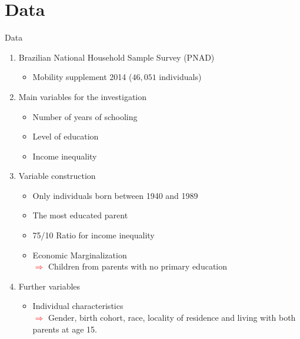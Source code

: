 \documentclass{beamer}
\begin{document}
\section{Data}
\begin{frame}[label=main4]{Data}
\begin{enumerate}
  		\item Brazilian National Household Sample Survey (PNAD)
  		\begin{itemize}
			\item \footnotesize Mobility supplement 2014 ($46,051$ individuals)
			\end{itemize}
			    \item Main variables for the investigation
  		\begin{itemize}
  		\item \footnotesize Number of years of schooling
  		 \item \footnotesize Level of education
  		 \item \footnotesize Income inequality
  		 \end{itemize}
  		 	 
  		\item Variable construction
  		\begin{itemize}
  		\item \footnotesize Only individuals born between 1940 and 1989
  		\item \footnotesize The most educated parent
  		\item \footnotesize 75/10 Ratio for income inequality 
  		\item \footnotesize Economic Marginalization \\ \tiny\textcolor{red}{$\Longrightarrow$} Children from parents with no primary education
  		  		\end{itemize}
  		\item Further variables
  		\begin{itemize}
  		\item \footnotesize Individual characteristics \\ \tiny\textcolor{red}{$\Longrightarrow$} Gender, birth cohort, race, locality of residence and living with both parents at age 15.
  		\end{itemize}
  		\end{enumerate}
\end{frame}
\end{document}
